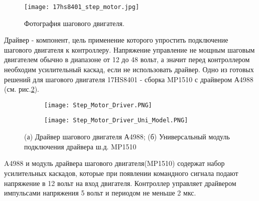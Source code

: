 \begin{figure}[ht]
	\centering
     \texttt{[image: 17hs8401\_step\_motor.jpg]}
	\caption{Фотография шагового двигателя.}
	\label{fig:17hs8401_step_motor}
\end{figure}
Драйвер - компонент, цель применение которого упростить подключение шагового двигателя к контроллеру. Напряжение управление не мощным шаговым двигателем обычно в диапазоне от 12 до 48 вольт, а значит перед контроллером необходим усилительный каскад, если не использовать драйвер. Одно из готовых решений для шагового двигателя 17HS8401 - сборка MP1510 с драйвером А4988 (см. рис.\ref{fig:Step_Motor_Driver}).
\begin{figure}[h]
    \centering
    \begin{subfigure}[b]{0.45\textwidth}
    \centering
        \texttt{[image: Step\_Motor\_Driver.PNG]}
        \caption{}
    \end{subfigure}
    \begin{subfigure}[b]{0.45\textwidth}
    \centering
        \texttt{[image: Step\_Motor\_Driver\_Uni\_Model.PNG]}
        \caption{}
    \end{subfigure}
    \caption{(а) Драйвер шагового двигателя А4988;
    (б) Универсальный модуль подключения драйвера ш.д. MP1510}
    \label{fig:Step_Motor_Driver}
\end{figure}
A4988 и модуль драйвера шагового двигателя(MP1510) содержат набор усилительных каскадов, которые при появлении командного сигнала подают напряжение в 12 вольт на вход двигателя. Контроллер управляет драйвером импульсами напряжения 5 вольт и периодом не меньше 2 мкс.

